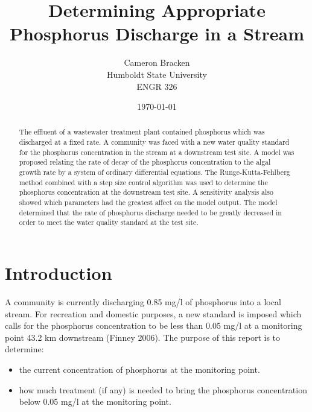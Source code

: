 \documentclass[titlepage,11pt]{article}
\begin{document}
\onehalfspacing



\begin{singlespacing}
\title{Determining Appropriate Phosphorus Discharge in a Stream}
\author{Cameron Bracken\\Humboldt State University\\ENGR 326}
\date{\today}
\maketitle
\newpage
\begin{abstract} The effluent of a wastewater treatment plant
contained phosphorus which was discharged at a fixed rate.  A
community was faced with a new water quality standard for the
phosphorus concentration in the stream at a downstream test site.  A
model was proposed relating the rate of decay of the phosphorus
concentration to the algal growth rate by a system of ordinary
differential equations. The Runge-Kutta-Fehlberg method combined
with a step size control algorithm was used to determine the
phosphorus concentration at the downstream test site. A sensitivity
analysis also showed which parameters had the greatest affect on the
model output.  The model determined that the rate of phosphorus
discharge needed to be greatly decreased in order to meet the water
quality standard at the test site.
\end{abstract}

\pagestyle{myheadings}
\tableofcontents{}
\listoffigures {}
\listoftables
\newpage
\end{singlespacing}
\pagestyle{headings}

\section {Introduction}
A community is currently discharging 0.85 mg/l of phosphorus into a
local stream. For recreation and domestic purposes, a new standard
is imposed which calls for the phosphorus concentration to be less
than 0.05 mg/l at a monitoring point 43.2 km downstream (Finney
2006). The purpose of this report is to determine:
\begin{itemize}
\item{the current concentration of phosphorus at the monitoring point.}
\item{how much treatment (if any) is needed to
bring the phosphorus concentration below 0.05 mg/l at the monitoring
point.}
\end{itemize}
\end{document}
